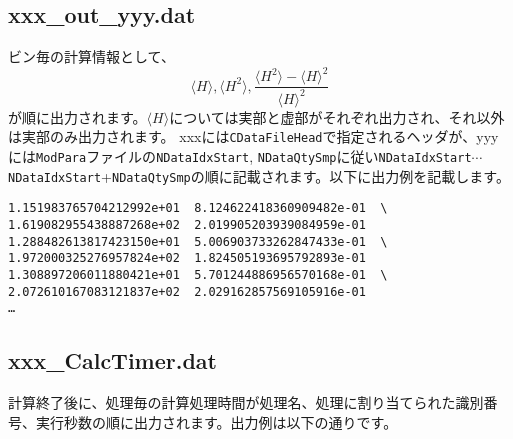 \subsection{xxx\_out\_yyy.dat}
ビン毎の計算情報として、
\begin{equation}
\langle H \rangle, \langle H^2 \rangle, \frac{\langle H^2 \rangle- \langle H \rangle^2 }{\langle H \rangle^2} \nonumber
\end{equation}
が順に出力されます。$\langle H \rangle$については実部と虚部がそれぞれ出力され、それ以外は実部のみ出力されます。
xxxには\verb|CDataFileHead|で指定されるヘッダが、yyyには\verb|ModPara|ファイルの\verb|NDataIdxStart|, \verb|NDataQtySmp|に従い\verb|NDataIdxStart|$\cdots$\verb|NDataIdxStart|+\verb|NDataQtySmp|の順に記載されます。以下に出力例を記載します。

\begin{minipage}{13cm}
\begin{screen}
\begin{verbatim}
1.151983765704212992e+01  8.124622418360909482e-01  \
1.619082955438887268e+02  2.019905203939084959e-01 
1.288482613817423150e+01  5.006903733262847433e-01  \ 
1.972000325276957824e+02  1.824505193695792893e-01
1.308897206011880421e+01  5.701244886956570168e-01  \
2.072610167083121837e+02  2.029162857569105916e-01
…
\end{verbatim}
\end{screen}
\end{minipage}

\subsection{xxx\_CalcTimer.dat }
計算終了後に、処理毎の計算処理時間が処理名、処理に割り当てられた識別番号、実行秒数の順に出力されます。出力例は以下の通りです。

